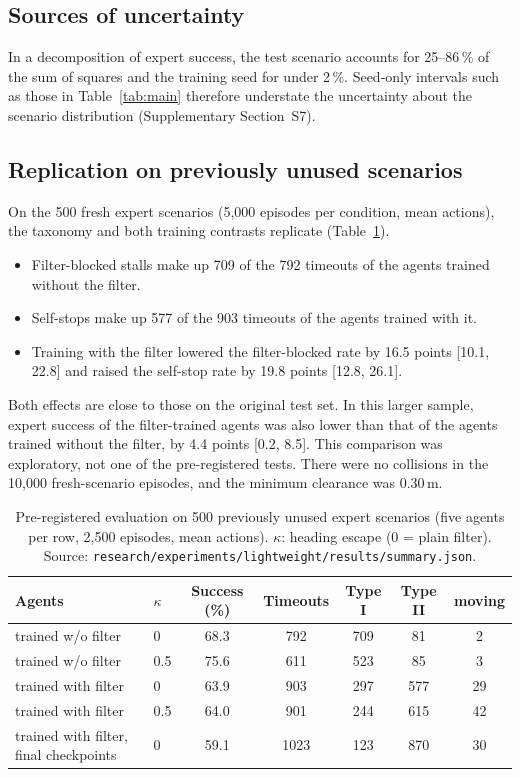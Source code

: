 \documentclass[11pt]{article}
\theoremstyle{definition}
\theoremstyle{remark}
\begin{document}
\subsection{Sources of uncertainty}
In a decomposition of expert success, the test scenario accounts for 25--86\,\% of the sum of squares and the training seed for under 2\,\%. Seed-only intervals such as those in Table~\ref{tab:main} therefore understate the uncertainty about the scenario distribution (Supplementary Section~S7).

\subsection{Replication on previously unused scenarios}
On the 500 fresh expert scenarios (5{,}000 episodes per condition, mean actions), the taxonomy and both training contrasts replicate (Table~\ref{tab:fresh}).
\begin{itemize}
  \item Filter-blocked stalls make up 709 of the 792 timeouts of the agents trained without the filter.
  \item Self-stops make up 577 of the 903 timeouts of the agents trained with it.
  \item Training with the filter lowered the filter-blocked rate by 16.5 points [10.1, 22.8] and raised the self-stop rate by 19.8 points [12.8, 26.1].
\end{itemize}
Both effects are close to those on the original test set. In this larger sample, expert success of the filter-trained agents was also lower than that of the agents trained without the filter, by 4.4 points [0.2, 8.5]. This comparison was exploratory, not one of the pre-registered tests. There were no collisions in the 10{,}000 fresh-scenario episodes, and the minimum clearance was 0.30\,m.

\begin{table}[t]
\centering\small
\caption{Pre-registered evaluation on 500 previously unused expert scenarios (five agents per row, 2{,}500 episodes, mean actions). $\kappa$: heading escape (0 = plain filter). Source: \texttt{research/experiments/lightweight/results/summary.json}.}
\label{tab:fresh}
\begin{tabular}{@{}llccccc@{}}
\toprule
Agents & $\kappa$ & Success (\%) & Timeouts & Type I & Type II & moving \\
\midrule
trained w/o filter & 0 & 68.3 & 792 & 709 & 81 & 2 \\
trained w/o filter & 0.5 & 75.6 & 611 & 523 & 85 & 3 \\
trained with filter & 0 & 63.9 & 903 & 297 & 577 & 29 \\
trained with filter & 0.5 & 64.0 & 901 & 244 & 615 & 42 \\
trained with filter, final checkpoints & 0 & 59.1 & 1023 & 123 & 870 & 30 \\
\bottomrule
\end{tabular}
\end{table}
\end{document}
